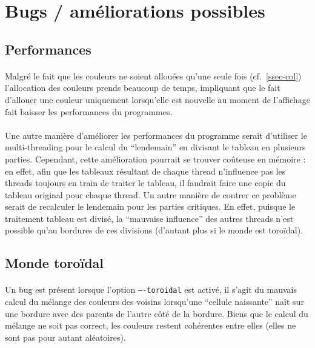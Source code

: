 \documentclass{report}
\begin{document}
\section{Bugs / améliorations possibles}

\subsection{Performances}

\paragraph{} Malgré le fait que les couleurs ne soient allouées qu'une seule
fois (cf.~\ref{ssec-col}) l'allocation des couleurs prends beaucoup de temps,
impliquant que le fait d'allouer une couleur uniquement lorsqu'elle est
nouvelle au moment de l'affichage fait baisser les performances du programmes.

\paragraph{} Une autre manière d'améliorer les performances du programme serait
d'utiliser le multi-threading pour le calcul du ``lendemain'' en divisant le
tableau en plusieurs parties. Cependant, cette amélioration pourrait se trouver
coûteuse en mémoire : en effet, afin que les tableaux résultant de chaque
thread n'influence pas les threads toujours en train de traiter le tableau, il
faudrait faire une copie du tableau original pour chaque thread. Un autre
manière de contrer ce problème serait de recalculer le lendemain pour les
parties critiques. En effet, puisque le traitement tableau est divisé, la
``mauvaise influence'' des autres threads n'est possible qu'au bordures de ces
divisions (d'autant plus si le monde est toroïdal).

\subsection{Monde toroïdal}

\paragraph{} Un bug est présent lorsque l'option \texttt{----toroidal} est
activé, il s'agit du mauvais calcul du mélange des couleurs des voisins
lorsqu'une ``cellule naissante'' naît sur une bordure avec des parents de
l'autre côté de la bordure. Biens que le calcul du mélange ne soit pas correct,
les couleurs restent cohérentes entre elles (elles ne sont pas pour autant
aléatoires).
\end{document}
